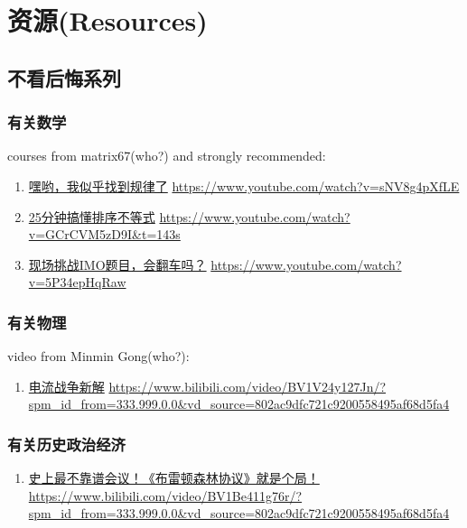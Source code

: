 \section{资源(Resources)}
\subsection{不看后悔系列}
\subsubsection{有关数学}
\noindent courses from matrix67(who?) and strongly recommended:
\begin{enumerate}
\item \href{https://www.youtube.com/watch?v=sNV8g4pXfLE}{嘿哟，我似乎找到规律了} \url{https://www.youtube.com/watch?v=sNV8g4pXfLE}
\item \href{https://www.youtube.com/watch?v=GCrCVM5zD9I&t=143s}{25分钟搞懂排序不等式} \url{https://www.youtube.com/watch?v=GCrCVM5zD9I&t=143s}
\item \href{https://www.youtube.com/watch?v=5P34epHqRaw}{现场挑战IMO题目，会翻车吗？} \url{https://www.youtube.com/watch?v=5P34epHqRaw}
\end{enumerate}

\subsubsection{有关物理}
\noindent video from Minmin Gong(who?):
\begin{enumerate}
\item \href{https://www.bilibili.com/video/BV1V24y127Jn/?spm_id_from=333.999.0.0&vd_source=802ac9dfc721c9200558495af68d5fa4}{电流战争新解} \url{https://www.bilibili.com/video/BV1V24y127Jn/?spm_id_from=333.999.0.0&vd_source=802ac9dfc721c9200558495af68d5fa4}
\end{enumerate}

\subsubsection{有关历史政治经济}
\begin{enumerate}
\item \href{https://www.bilibili.com/video/BV1Be411g76r/?spm_id_from=333.999.0.0&vd_source=802ac9dfc721c9200558495af68d5fa4}{史上最不靠谱会议！《布雷顿森林协议》就是个局！} \url{https://www.bilibili.com/video/BV1Be411g76r/?spm_id_from=333.999.0.0&vd_source=802ac9dfc721c9200558495af68d5fa4}
\end{enumerate}


